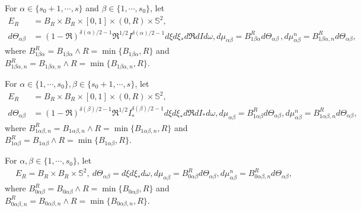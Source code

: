 \documentclass[reqno,11pt]{amsart}
\numberwithin{equation}{section}
\begin{document}
For $\alpha \in  \{s_0+1,\cdots,s\} $ and $ \beta \in \{1,\cdots,s_0\}$, let
\begin{equation*}
	\begin{aligned}
		E_R&=B_R\times B_R \times [0,1]\times (0,R)\times \mathbb{S}^2,\\
		d \Theta_{\alpha \beta} &= (1-\mathfrak{R})^{\delta(\alpha)/2-1}\mathfrak{R}^{1/2} I^{\delta(\alpha)/2-1} d\xi d\xi_* d \mathfrak{R} dI d\omega, d\mu_{\alpha \beta} = B^R_{1\beta \alpha } d \Theta_{\alpha \beta} \,, d \mu_{\alpha \beta}^n = B^R_{1\beta \alpha ,n} d \Theta_{\alpha \beta} , 
	\end{aligned}
\end{equation*}
where $B^R_{1\beta \alpha }= B_{1\beta \alpha }\wedge R = \min \{ B_{1\beta \alpha } , R \} $ and $B^R_{1\beta \alpha, n }= B_{1\beta \alpha, n }\wedge R = \min \{ B_{1\beta \alpha, n } , R \} $. 

For $\alpha \in \{1,\cdots,s_0\} , \beta \in \{s_0+1,\cdots,s\} $, let
\begin{equation*}
	\begin{aligned}
		E_R&=B_R \times B_R \times [0,1]\times (0,R)\times \mathbb{S}^2,\\
		d \Theta_{\alpha \beta} & = (1-\mathfrak{R})^{\delta(\beta)/2-1} \mathfrak{R}^{1/2} I_*^{\delta(\beta )/2-1} d\xi d\xi_* d \mathfrak{R} dI_* d\omega, d \mu_{\alpha \beta} = B^R_{1\alpha \beta } d \Theta_{\alpha \beta} , d \mu_{\alpha \beta}^n = B^R_{1\alpha \beta, n } d \Theta_{\alpha \beta} , 
	\end{aligned}
\end{equation*}
where $B^R_{1\alpha \beta,n }= B_{1\alpha \beta, n }\wedge R = \min \{ B_{1\alpha \beta, n } , R \} $ and $B^R_{1\alpha \beta}= B_{1\alpha \beta}\wedge R = \min \{ B_{1\alpha \beta} , R \} $. 

For $ \alpha , \beta \in \{1,\cdots,s_0\} $, let
\begin{equation*}
	\begin{aligned}
		E_R =B_R\times B_R \times \mathbb{S}^2, \ d \Theta_{\alpha \beta} = d\xi d\xi_* d\omega, d \mu_{\alpha \beta} = B^R_{0\alpha \beta } d \Theta_{\alpha \beta} , d \mu_{\alpha \beta}^n = B^R_{0\alpha \beta, n } d \Theta_{\alpha \beta} , 
	\end{aligned}
\end{equation*}
where $B^R_{0 \alpha \beta }= B_{0 \alpha \beta }\wedge R = \min \{ B_{0 \alpha \beta }, R \} $ and $B^R_{0 \alpha \beta, n }= B_{0 \alpha \beta,n }\wedge R = \min \{ B_{0 \alpha \beta, n }, R \} $.
\end{document}
